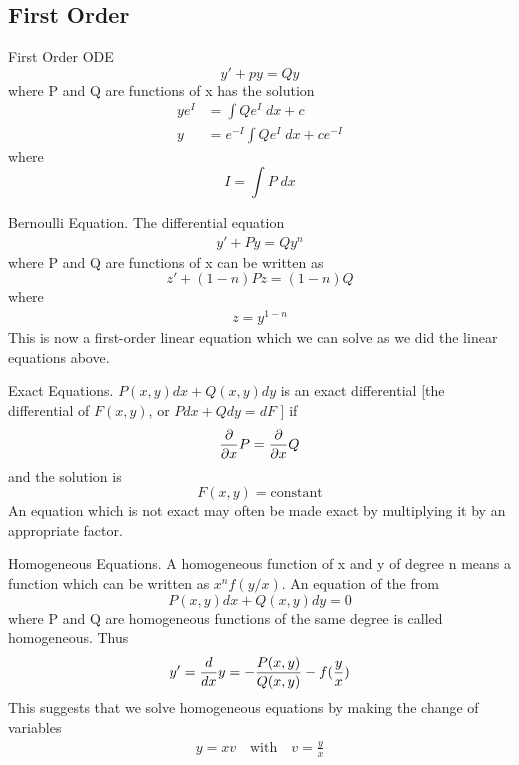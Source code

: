 \documentclass[../main.tex]{subfiles}
\begin{document}
\subsection*{First Order}
First Order ODE
\begin{equation}
    y'+py=Qy
\end{equation}
where P and Q are functions of x has the solution
\begin{align*}
    ye^I&=\int Q e^I\;dx+c\\
    y&=e^{-I}\int Q e^I\;dx+ce^{-I}
\end{align*}
where\begin{equation*}
    I=\int P\;dx
\end{equation*}

Bernoulli Equation. The differential equation
\begin{align*}
    y'+Py=Qy^n
\end{align*}
where P and Q are functions of x can be written as
\begin{equation}
    z'+(1-n)Pz=(1 - n)Q
\end{equation}
where\begin{align*}
    z = y^{1-n}
\end{align*}
This is now a first-order linear equation which we can solve as we did the linear
equations above. 

Exact Equations.  $P (x, y) dx+Q(x, y)dy$ is an exact differential [the differential of $F (x, y)$, or $P dx + Q dy = dF$  ] if
\begin{equation*}
    \frac{\partial}{\partial x} P=\frac{\partial}{\partial x} Q
\end{equation*}
and the solution is
\begin{equation*}
    F (x, y) = \text{constant}    
\end{equation*}
An equation which is not exact may often be made exact by multiplying it by
an appropriate factor.

Homogeneous Equations. A homogeneous function of x and y of degree n means
a function which can be written as $x^nf (y/x)$.
An equation of the from
\begin{equation*}
    P (x, y) dx + Q(x, y) dy = 0
\end{equation*}
where P and Q are homogeneous functions of the same degree is called homogeneous.
Thus
\begin{equation*}
    y'=\frac{d}{dx} y=-\frac{P (x, y)}{Q(x, y)}-f(\frac{y}{x})
\end{equation*}
This suggests that we solve homogeneous equations by
making the change of variables
\begin{align*}
    y=xv\quad\text{with}\quad v=\frac{y}{x}
\end{align*}
\end{document}
